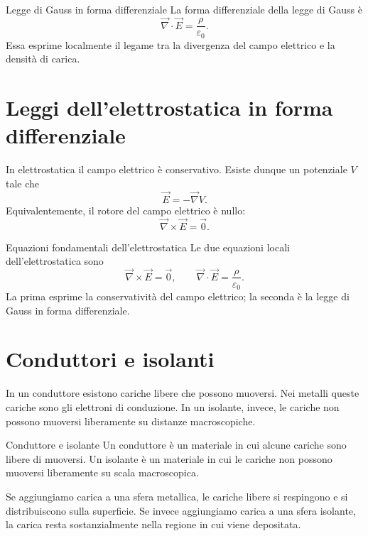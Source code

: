 \documentclass[a4paper]{article}
\begin{document}
\begin{snippettheorem}{Legge di Gauss in forma differenziale}
    La forma differenziale della legge di Gauss è
    \[
        \vec{\nabla}\cdot\vec{E}=\frac{\rho}{\varepsilon_0}.
    \]
    Essa esprime localmente il legame tra la divergenza del campo elettrico e la densità di carica.
\end{snippettheorem}

\section{Leggi dell'elettrostatica in forma differenziale}

In elettrostatica il campo elettrico è conservativo. Esiste dunque un potenziale \(V\) tale che
\[
    \vec{E}=-\vec{\nabla}V.
\]
Equivalentemente, il rotore del campo elettrico è nullo:
\[
    \vec{\nabla}\times\vec{E}=\vec{0}.
\]

\begin{snippettheorem}{Equazioni fondamentali dell'elettrostatica}
    Le due equazioni locali dell'elettrostatica sono
    \[
        \vec{\nabla}\times\vec{E}=\vec{0},
        \qquad
        \vec{\nabla}\cdot\vec{E}=\frac{\rho}{\varepsilon_0}.
    \]
    La prima esprime la conservatività del campo elettrico; la seconda è la legge di Gauss in forma differenziale.
\end{snippettheorem}

\section{Conduttori e isolanti}

In un conduttore esistono cariche libere che possono muoversi. Nei metalli queste cariche sono gli elettroni di conduzione. In un isolante, invece, le cariche non possono muoversi liberamente su distanze macroscopiche.

\begin{snippetdefinition}{Conduttore e isolante}
    Un conduttore è un materiale in cui alcune cariche sono libere di muoversi. Un isolante è un materiale in cui le cariche non possono muoversi liberamente su scala macroscopica.
\end{snippetdefinition}

Se aggiungiamo carica a una sfera metallica, le cariche libere si respingono e si distribuiscono sulla superficie. Se invece aggiungiamo carica a una sfera isolante, la carica resta sostanzialmente nella regione in cui viene depositata.
\end{document}
